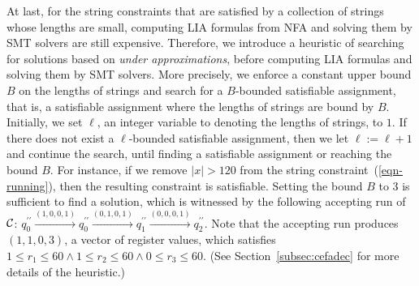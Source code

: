 At last, for the string constraints that are satisfied by a collection of strings whose lengths are small, computing LIA formulas from NFA and solving them by SMT solvers are still expensive.  
Therefore, we introduce a heuristic of searching for solutions based on \emph{under approximations}, before computing LIA formulas and solving them by SMT solvers. More precisely, we enforce a constant upper bound $B$ on the lengths of strings and search for a $B$-bounded satisfiable assignment, that is, a satisfiable assignment where the lengths of strings are bound by $B$. Initially, we set $\ell$, an integer variable to denoting the lengths of strings, to $1$. If there does not exist a  $\ell$-bounded satisfiable assignment, then we let $\ell:=\ell+1$ and continue the search, until finding a satisfiable assignment or reaching the bound $B$. For instance, if we remove $|x| > 120$ from the string constraint~(\ref{eqn-running}), then the resulting constraint is satisfiable. Setting the bound $B$ to $3$ is sufficient to find a solution, which is witnessed by the following accepting run of $\mathcal{C}$: $q^{\prime\prime}_0 \xrightarrow{(1,0,0,1)} q^{\prime\prime}_0 \xrightarrow{(0,1,0,1)} q^{\prime\prime}_1 \xrightarrow{(0,0,0,1)} q^{\prime\prime}_2$. Note that the accepting run produces $(1,1,0,3)$, a vector of register values,  which satisfies $1 \le r_1 \le 60 \wedge 1 \le r_2 \le 60 \wedge 0 \le r_3 \le 60$. (See Section~\ref{subsec:cefadec} for more details of the heuristic.)





